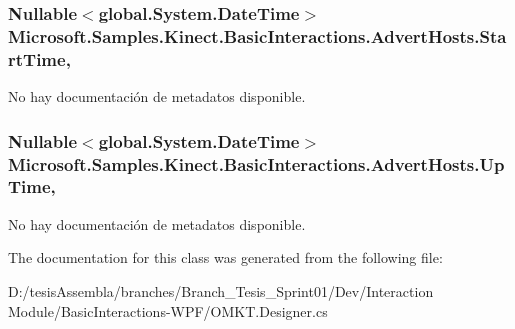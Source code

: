 \hypertarget{class_microsoft_1_1_samples_1_1_kinect_1_1_basic_interactions_1_1_advert_hosts_a06ba7fc7c52bcf0071a4059b276a6d52}{
\subsubsection[{Start\-Time}]{\setlength{\rightskip}{0pt plus 5cm}Nullable$<$global.\-System.\-Date\-Time$>$ Microsoft.\-Samples.\-Kinect.\-Basic\-Interactions.\-Advert\-Hosts.\-Start\-Time\hspace{0.3cm}{\ttfamily [get]}, {\ttfamily [set]}}}\label{class_microsoft_1_1_samples_1_1_kinect_1_1_basic_interactions_1_1_advert_hosts_a06ba7fc7c52bcf0071a4059b276a6d52}


No hay documentación de metadatos disponible. 

\hypertarget{class_microsoft_1_1_samples_1_1_kinect_1_1_basic_interactions_1_1_advert_hosts_a060ddb118e9335b96f36742f98f1d352}{
\subsubsection[{Up\-Time}]{\setlength{\rightskip}{0pt plus 5cm}Nullable$<$global.\-System.\-Date\-Time$>$ Microsoft.\-Samples.\-Kinect.\-Basic\-Interactions.\-Advert\-Hosts.\-Up\-Time\hspace{0.3cm}{\ttfamily [get]}, {\ttfamily [set]}}}\label{class_microsoft_1_1_samples_1_1_kinect_1_1_basic_interactions_1_1_advert_hosts_a060ddb118e9335b96f36742f98f1d352}


No hay documentación de metadatos disponible. 



The documentation for this class was generated from the following file\-:\begin{DoxyCompactItemize}
\item 
D\-:/tesis\-Assembla/branches/\-Branch\-\_\-\-Tesis\-\_\-\-Sprint01/\-Dev/\-Interaction Module/\-Basic\-Interactions-\/\-W\-P\-F/O\-M\-K\-T.\-Designer.\-cs\end{DoxyCompactItemize}
